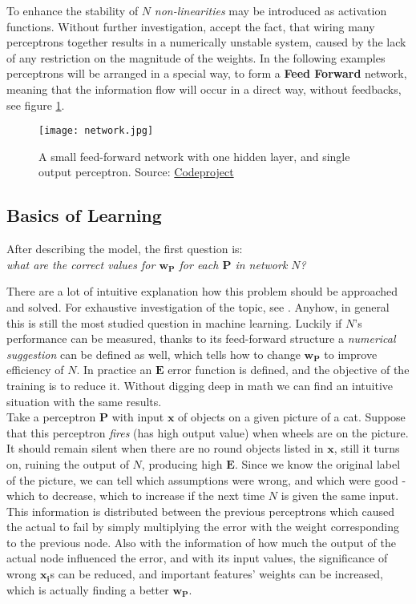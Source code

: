 To enhance the stability of $N$  \emph{non-linearities} may be introduced as activation functions. Without further investigation, accept the fact, that wiring many perceptrons together results in a numerically unstable system, caused by the lack of any restriction on the magnitude of the weights. In the following examples perceptrons will be arranged in a special way, to form a \textbf{Feed Forward} network, meaning that the information flow will occur in a direct way, without feedbacks, see figure \ref{fig:ff}.

\begin{figure}
	\centering
	\texttt{[image: network.jpg]}
	\caption{A small feed-forward network with one hidden layer, and single output perceptron.
	Source: \href{http://www.codeproject.com/KB/dotnet/predictor/network.jpg}{Codeproject} 	}
	\label{fig:ff}
\end{figure}

\subsection{Basics of Learning}
After describing the model, the first question is:\\
\emph{what are the correct values for $\mathbf{w_P}$ for each $\mathbf{P}$ in network $N$?}

There are a lot of intuitive explanation how this problem should be approached and solved. For exhaustive investigation of the topic, see \cite{nnsdl}. 
Anyhow, in general this is still the most studied question in machine learning. 
Luckily if $N$'s performance can be measured, thanks to its feed-forward structure a \emph{numerical suggestion} can be defined as well, which tells how to change $\mathbf{w_P}$ to improve efficiency of $N$. In practice an $\mathbf{E}$ error function is defined, and the objective of the training is to reduce it. Without digging deep in math we can find an intuitive situation with the same results.\\

Take a perceptron $\mathbf{P}$ with input $\mathbf{x}$ of objects on a given picture of a cat. Suppose that this perceptron \emph{fires} (has high output value) when wheels are on the picture. It should remain silent when there are no round objects listed in 
$\mathbf{x}$, still it turns on, ruining the output of $N$, producing high $\mathbf{E}$.
Since we know the original label of the picture, we can tell which assumptions were wrong, and which were good - which to decrease, which to increase if the next time $N$ is given the same input. This information is distributed between the previous perceptrons which caused the actual to fail by simply multiplying the error with the weight corresponding to the previous node. Also with the information of how much the output of the actual node influenced the error, and with its input values, the significance of wrong $\mathbf{x_i}$s can be reduced, and important features' weights can be increased, which is actually finding a better $\mathbf{w_P}$.

